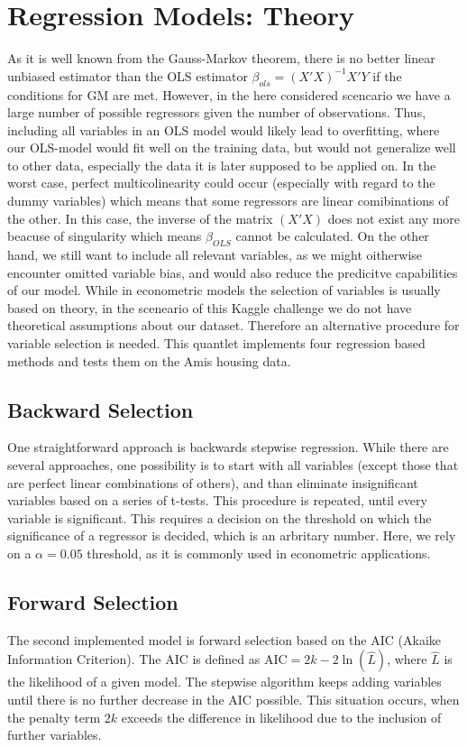 \section{Regression Models: Theory}
As it is well known from the Gauss-Markov theorem, there is no better linear unbiased estimator than the OLS estimator $\beta_{ols} = (X'X)^{-1}X'Y$  if the conditions for GM are met. However, in the here considered scencario we have a large number of possible regressors given the number of observations. Thus, including all variables in an OLS model would likely lead to overfitting, where our OLS-model would fit well on the training data, but would not generalize well to other data, especially the data it is later supposed to be applied on. In the worst case, perfect multicolinearity could occur (especially with regard to the dummy variables)  which means that some regressors are linear comibinations of the other. In this case, the inverse of the matrix $(X'X)$ does not exist any more beacuse of singularity which means $\beta_{OLS}$ cannot be calculated.  
On the other hand, we still want to include all relevant variables, as we might oitherwise encounter omitted variable bias, and would also reduce the predicitve capabilities of our model. 
While in econometric models  the selection of variables is usually based on theory, in the sceneario of this Kaggle challenge we do not have theoretical assumptions about our dataset. Therefore an alternative procedure for variable selection is needed. This quantlet implements four regression based methods and tests them on the Amis housing data. 

\subsection{Backward Selection}
One straightforward approach is backwards stepwise regression. While there are several approaches, one possibility is to  start with all variables (except those that are perfect linear combinations of others), and than eliminate insignificant variables based on a series of  t-tests. This procedure is repeated, until every variable is significant. This requires a decision on the threshold on which the significance of a regressor is decided, which is an arbritary number. Here, we rely on a $\alpha = 0.05$ threshold, as it is commonly used in econometric applications. 

\subsection{Forward Selection}
The second implemented model is forward selection based on the AIC (Akaike Information Criterion). The AIC is defined as 
${\displaystyle \mathrm{AIC}=2k-2\ln({\hat{L}})}$, where $\hat{L}$ is the likelihood of a given model. The stepwise algorithm keeps adding variables until there is no further decrease in the AIC possible. This situation occurs, when the penalty term $2k$ exceeds the difference in likelihood due to the inclusion of further variables. 

